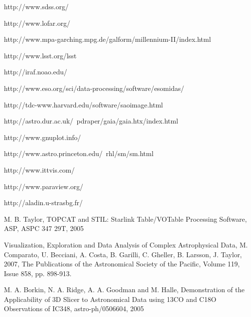 \begin{thebibliography}{00}








 http://www.sdss.org/

 http://www.lofar.org/

http://www.mpa-garching.mpg.de/galform/millennium-II/index.html

http://www.lsst.org/lsst

 http://iraf.noao.edu/

 http://www.eso.org/sci/data-processing/software/esomidas/

 http://tdc-www.harvard.edu/software/saoimage.html

 http://astro.dur.ac.uk/~pdraper/gaia/gaia.htx/index.html

 http://www.gnuplot.info/

 http://www.astro.princeton.edu/~rhl/sm/sm.html

 http://www.ittvis.com/


 http://www.paraview.org/

 http://aladin.u-strasbg.fr/

 M. B. Taylor, TOPCAT and STIL: Starlink Table/VOTable Processing Software, ASP, ASPC 347 29T, 2005

Visualization, Exploration and Data Analysis of Complex Astrophysical Data,
M. Comparato, U. Becciani, A. Costa, B. Garilli, C. Gheller, B. Larsson, J. Taylor, 2007, 
The Publications of the Astronomical Society of the Pacific, Volume 119, Issue 858, pp. 898-913.

 M. A. Borkin, N. A. Ridge, A. A. Goodman and M. Halle, Demonstration of the Applicability of 3D Slicer to Astronomical Data using 13CO and C18O Observations of IC348, astro-ph/0506604, 2005


\end{thebibliography}
